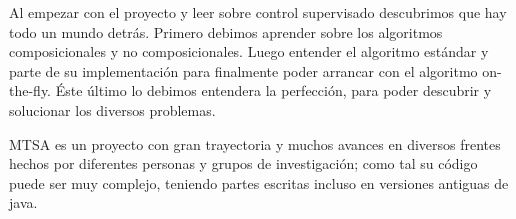 % 
% 

Al empezar con el proyecto y leer sobre control supervisado descubrimos que hay todo un mundo detrás. Primero debimos aprender sobre los algoritmos composicionales y no composicionales. Luego entender el algoritmo estándar y parte de su implementación para finalmente poder arrancar con el algoritmo on-the-fly. Éste último lo debimos entendera la perfección, para poder descubrir y solucionar los diversos problemas. 

MTSA es un proyecto con gran trayectoria y muchos avances en diversos frentes hechos por diferentes personas y grupos de investigación; como tal su código puede ser muy complejo, teniendo partes escritas incluso en versiones antiguas de java.

